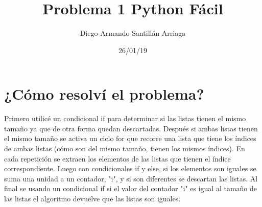 \documentclass[letterpaper, 12pt, oneside]{article}%
\title{\Huge Problema 1 Python Fácil}
\author{Diego Armando Santillán Arriaga}
\date{26/01/19}
\begin{document}
\maketitle
\newpage
\section*{¿Cómo resolví el problema?}
Primero utilicé un condicional if para determinar si las listas tienen el mismo tamaño ya que de otra forma quedan descartadas. Después si ambas listas tienen el mismo tamaño se activa un ciclo for que recorre una lista que tiene los índices de ambas listas (cómo son del mismo tamaño, tienen los mismos índices). En cada repetición se extraen los elementos de las listas que tienen el índice correspondiente. Luego con condicionales if y else, si los elementos son iguales se suma una unidad a un contador, "i", y si son diferentes se descartan las listas. Al final se usando un condicional if si el valor del contador "i" es igual al tamaño de las listas el algoritmo devuelve que las listas son iguales. 
\end{document}
